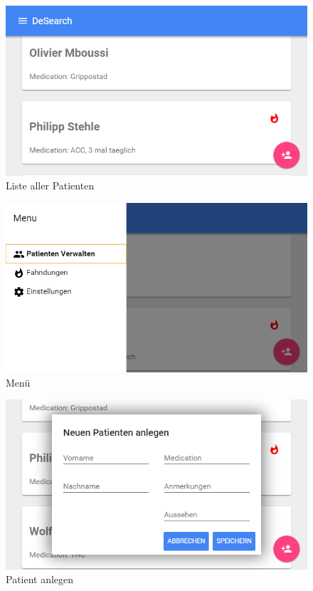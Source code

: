 \begin{figure}
	\centering
	\includegraphics[width=1.0\linewidth]{images/ui/personenliste}
	\caption{Liste aller Patienten}
	\label{img:ui/personenliste}
\end{figure}

\begin{figure}
	\centering
	\includegraphics[width=1.0\linewidth]{images/ui/menu}
	\caption{Menü}
	\label{img:ui/menu}
\end{figure}

\begin{figure}
	\centering
	\includegraphics[width=1.0\linewidth]{images/ui/personhinzufuegen}
	\caption{Patient anlegen}
	\label{img:ui/personhinzufuegen}
\end{figure}

